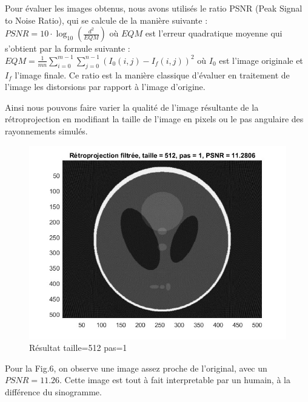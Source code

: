 \documentclass[conference]{IEEEtran}
\begin{document}
Pour évaluer les images obtenus, nous avons utilisés le ratio PSNR (Peak Signal to Noise Ratio), qui se calcule de la manière suivante :
$PSNR=10\cdot\log_{10} (\frac{d^2}{EQM})$
où $EQM$ est l'erreur quadratique moyenne qui s'obtient par la formule suivante :
$EQM=\frac{1}{mn}\sum_{i=0}^{m-1}\sum_{j=0}^{n-1}(I_0(i,j)-I_f(i,j))^2$
où $I_0$ est l'image originale et $I_f$ l'image finale.
Ce ratio est la manière classique d'évaluer en traitement de l'image les distorsions par rapport à l'image d'origine.

Ainsi nous pouvons faire varier la qualité de l'image résultante de la rétroprojection en modifiant la taille de l'image en pixels ou le pas angulaire des rayonnements simulés.

\begin{figure}[H]
\centering
\includegraphics[scale=0.5]{t512-p1}
	\caption[Résultat taille=512 pas=1]{Résultat taille=512 pas=1}
\label{fig:gallery}
\end{figure}

Pour la Fig.6, on observe une image assez proche de l'original, avec un $PSNR=11.26$. Cette image est tout à fait interpretable par un humain, à la différence du sinogramme.
\end{document}
